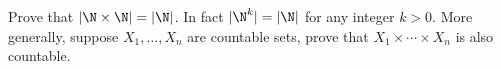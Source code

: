 Prove that $|\N \times \N| = |\N|$. In fact $|\N^k| = |\N|$ for any
integer $k>0$. More generally, suppose $X_1, \ldots, X_n$ are
countable sets, prove that $X_1 \times \cdots \times X_n$ is also
countable.
